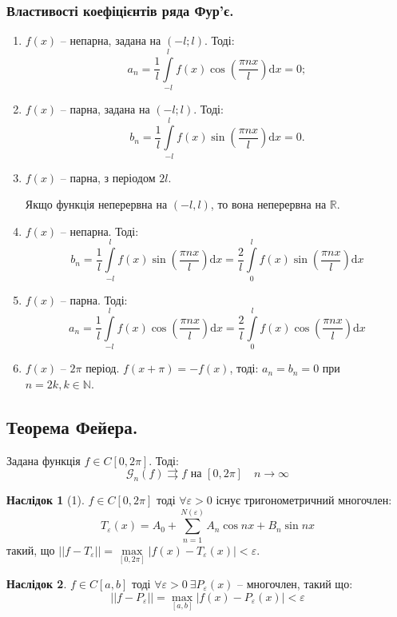 \documentclass[a4paper]{scrartcl}
\theoremstyle{definition}
\theoremstyle{remark}
\theoremstyle{definition}
\newtheorem*{consequence}{Наслідок}
\theoremstyle{definition}
\def\i{\infty}                 %
\begin{document}
\subsubsection*{Властивості коефіцієнтів ряда Фур'є.}
\begin{enumerate}
  \item $f(x)$ -- непарна, задана на $(-l; l)$. Тоді:
  $$
  a_n = \frac{1}{l}  \int\limits_{-l}^{ l}{
  f(x) \cos{( \frac{\pi n x}{l} )} \mathrm{d} x
  } = 0 ;
  $$
  \item $f(x)$ -- парна, задана на $(-l; l)$. Тоді:
  $$
  b_n = \frac{1}{l}  \int\limits_{-l}^{ l}{
  f(x) \sin{( \frac{\pi n x}{l} ) } \mathrm{d} x
  }  = 0.
  $$
  \item $f(x)$ -- парна, з періодом $2l$. \par
  Якщо функція неперервна на $(-l, l)$, то вона неперервна на $\mathbb{R}$.
  \item $f(x)$ -- непарна. Тоді:
  $$
  b_n = \frac{1}{l}  \int\limits_{-l}^{ l}{
  f(x) \sin{( \frac{\pi n x}{l} ) } \mathrm{d} x
  }  = \frac{2}{l}  \int\limits_{0}^{ l}{
  f(x) \sin{( \frac{\pi n x}{l} ) } \mathrm{d} x
  } $$
  \item $f(x)$ -- парна. Тоді:
  $$
  a_n = \frac{1}{l}  \int\limits_{-l}^{ l}{
  f(x) \cos{( \frac{\pi n x}{l} ) } \mathrm{d} x
  }  = \frac{2}{l}  \int\limits_{0}^{ l}{
  f(x) \cos{( \frac{\pi n x}{l} ) } \mathrm{d} x
  }
  $$
  \item  $f(x)$ -- \( 2\pi \) період. \( f(x+ \pi) = -f(x) \), тоді: \(
    a_n = b_n = 0
 \) при \( n = 2k, k\in \mathbb{N} \).
\end{enumerate}
\newpage
\subsection{Теорема Фейера.}
\begin{boxteo}[Фейера]
Задана функція \( f  \in C[0, 2\pi]\). Тоді:
\[
 \mathcal{G}_n (f) \rightrightarrows f  \text{ на } [0, 2\pi] \quad n \to \i
\]
\end{boxteo}
\begin{consequence}[1]
\(   f \in C [0, 2 \pi] \) тоді \( \forall \varepsilon >0 \) існує тригонометричний многочлен:
\[
 T_{\varepsilon}(x) = A_0 +  \sum\limits_{n=1}^{N(\varepsilon)}{A_n \cos{ nx} + B_n \sin{ nx}}
\]
такий, що \( ||f - T_{\varepsilon}|| =  \max\limits_{[0,2\pi]}{ \left| f(x) - T_{\varepsilon}(x) \right|  } < \varepsilon \).
\end{consequence}
\begin{consequence}{2}
  \( f \in C [a,b] \) тоді \( \forall \varepsilon> 0 \  \exists P_{\varepsilon} (x)\) -- многочлен, такий що: \[ ||f - P_{\varepsilon}|| =  \max\limits_{[a,b]}{ \left| f(x) - P_{\varepsilon}(x) \right|  } < \varepsilon \]
\end{consequence}
\end{document}
